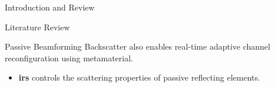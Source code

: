 \documentclass[9pt]{beamer}
\begin{document}
\begin{section}{Introduction and Review}
\begin{subsection}{Literature Review}
			\begin{frame}{Passive Beamforming}
				Backscatter also enables real-time adaptive \alert{channel reconfiguration} using metamaterial.
				\begin{figure}[!t]
					\centering
				\end{figure}
				\begin{itemize}
					\item \textbf{\gls{irs}} controls the scattering properties of passive reflecting elements.
				\end{itemize}
			\end{frame}


\end{subsection}
\end{section}
\end{document}

